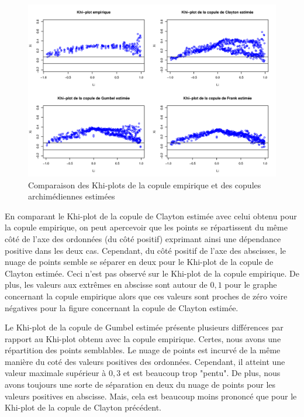 \noindent%
\begin{figure}[H]
    \begin{center}
      \includegraphics[width=17 cm, angle=0]{./pictures/archcmlkhiplot.png}
      \centering\caption{\label{2}Comparaison des Khi-plots de la copule empirique et des copules archimédiennes estimées}
    \end{center}
\end{figure}

En comparant le Khi-plot de la copule de Clayton estimée avec celui obtenu pour la copule empirique, on peut apercevoir que les points se répartissent du même côté de l'axe des ordonnées (du côté positif) exprimant ainsi une dépendance positive dans les deux cas. Cependant, du côté positif de l'axe des abscisses, le nuage de points semble se séparer en deux pour le Khi-plot de la copule de Clayton estimée. Ceci n'est pas observé sur le Khi-plot de la copule empirique. De plus, les valeurs aux extrêmes en abscisse sont autour de $0,1$ pour le graphe concernant la copule empirique alors que ces valeurs sont proches de zéro voire négatives pour la figure concernant la copule de Clayton estimée.

Le Khi-plot de la copule de Gumbel estimée présente plusieurs différences par rapport au Khi-plot obtenu avec la copule empirique. Certes, nous avons une répartition des points semblables. Le nuage de points est incurvé de la même manière du coté des valeurs positives des ordonnées. Cependant, il atteint une valeur maximale supérieur à $0,3$ et est beaucoup trop "pentu". De plus, nous avons toujours une sorte de séparation en deux du nuage de points pour les valeurs positives en abscisse. Mais, cela est beaucoup moins prononcé que pour le Khi-plot de la copule de Clayton précédent.

